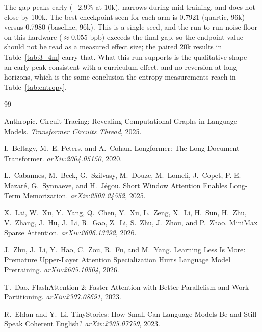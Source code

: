 \documentclass[11pt,a4paper]{article}
\begin{document}
The gap peaks early ($+2.9$\% at 10k), narrows during mid-training, and does not close by 100k. The best checkpoint seen for each arm is 0.7921 (quartic, 96k) versus 0.7980 (baseline, 96k). This is a single seed, and the run-to-run noise floor on this hardware (${\approx}0.055$ bpb) exceeds the final gap, so the endpoint value should not be read as a measured effect size; the paired 20k results in Table~\ref{tab:3_4m} carry that. What this run supports is the qualitative shape---an early peak consistent with a curriculum effect, and no reversion at long horizons, which is the same conclusion the entropy measurements reach in Table~\ref{tab:entropy}.



\begin{thebibliography}{99}

Anthropic.
\newblock Circuit Tracing: Revealing Computational Graphs in Language Models.
\newblock \emph{Transformer Circuits Thread}, 2025.

I.~Beltagy, M.~E. Peters, and A.~Cohan.
\newblock Longformer: The Long-Document Transformer.
\newblock \emph{arXiv:2004.05150}, 2020.

L.~Cabannes, M.~Beck, G.~Szilvasy, M.~Douze, M.~Lomeli, J.~Copet, P.-E. Mazar\'e, G.~Synnaeve, and H.~J\'egou.
\newblock Short Window Attention Enables Long-Term Memorization.
\newblock \emph{arXiv:2509.24552}, 2025.

X.~Lai, W.~Xu, Y.~Yang, Q.~Chen, Y.~Xu, L.~Zeng, X.~Li, H.~Sun, H.~Zhu, V.~Zhang, J.~Hu, J.~Li, R.~Gao, Z.~Li, S.~Zhu, J.~Zhou, and P.~Zhao.
\newblock MiniMax Sparse Attention.
\newblock \emph{arXiv:2606.13392}, 2026.

J.~Zhu, J.~Li, Y.~Hao, C.~Zou, R.~Fu, and M.~Yang.
\newblock Learning Less Is More: Premature Upper-Layer Attention Specialization Hurts Language Model Pretraining.
\newblock \emph{arXiv:2605.10504}, 2026.

T.~Dao.
\newblock FlashAttention-2: Faster Attention with Better Parallelism and Work Partitioning.
\newblock \emph{arXiv:2307.08691}, 2023.

R.~Eldan and Y.~Li.
\newblock TinyStories: How Small Can Language Models Be and Still Speak Coherent English?
\newblock \emph{arXiv:2305.07759}, 2023.


\end{thebibliography}
\end{document}
